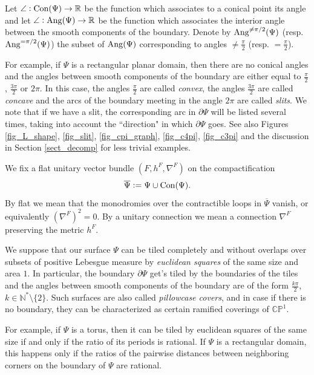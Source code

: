 \documentclass[12pt]{article}
\numberwithin{equation}{section}
\theoremstyle{theorem}
\theoremstyle{definition}
\theoremstyle{remark}
\newcommand{\real}{\mathbb{R}}
\newcommand{\nat}{\mathbb{N}}
\begin{document}
	Let $\angle : {\rm{Con}}(\Psi) \to \real$ be the function which associates to a conical point its angle and let $\angle : {\rm{Ang}}(\Psi) \to \real$ be the function which associates the interior angle between the smooth components of the boundary.
	Denote by ${\rm{Ang}}^{\neq \pi/2}(\Psi)$ (resp. ${\rm{Ang}}^{= \pi/2}(\Psi)$) the subset of ${\rm{Ang}}(\Psi)$ corresponding to angles $\neq \frac{\pi}{2}$ (resp. $= \frac{\pi}{2}$).
	\par 
	For example, if $\Psi$ is a rectangular planar domain, then there are no conical angles and the angles between smooth components of the boundary are either equal to $\frac{\pi}{2}$, $\frac{3\pi}{2}$ or $2\pi$. In this case, the angles $\frac{\pi}{2}$ are called \textit{convex}, the angles $\frac{3\pi}{2}$ are called \textit{concave} and the arcs of the boundary meeting in the angle $2 \pi$ are called \textit{slits}. We note that if we have a slit, the corresponding arc in $\partial \Psi$ will be listed several times, taking into account the “direction" in which $\partial \Psi$ goes.
	See also Figures \ref{fig_L_shape}, \ref{fig_slit}, \ref{fig_cpi_graph}, \ref{fig_c4pi}, \ref{fig_c3pi} and the discussion in Section \ref{sect_decomp} for less trivial examples.
	\par 
	We fix a flat unitary vector bundle $(F, h^F, \nabla^F)$ on the compactification 
	\begin{equation}
		\overline{\Psi} := \Psi \cup {\rm{Con}}(\Psi).	
	\end{equation}
	By flat we mean that the monodromies over the contractible loops in $\overline{\Psi}$ vanish, or equivalently $(\nabla^F)^2 = 0$.
	By a unitary connection we mean a connection $\nabla^F$ preserving the metric $h^F$.
	\par 
	We suppose that our surface $\Psi$ can be tiled completely and without overlaps over subsets of positive Lebesgue measure by \textit{euclidean squares} of the same size and area $1$. In particular, the boundary $\partial \Psi$ get's tiled by the boundaries of the tiles and the angles between smooth components of the boundary are of the form $\frac{k \pi}{2}$, $k \in \nat^* \setminus \{2\}$.
	Such surfaces are also called \textit{pillowcase covers}, and in case if there is no boundary, they can be characterized as certain ramified coverings of $\mathbb{CP}^1$.
	\par 
	For example, if $\Psi$ is a torus, then it can be tiled by euclidean squares of the same size if and only if the ratio of its periods is rational.
	If $\Psi$ is a rectangular domain, this happens only if the ratios of the pairwise distances between neighboring corners on the boundary of $\Psi$ are rational. 
\end{document}
